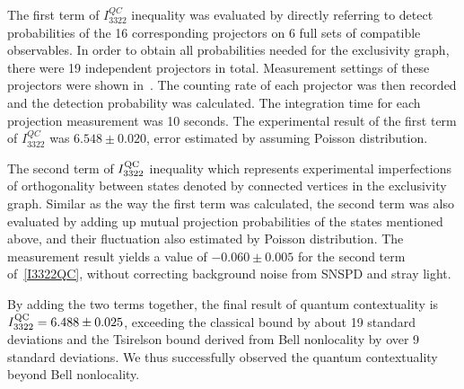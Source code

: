 \documentclass[prl,letterpaper,english,reprint,nofootinbib,aps,superscriptaddress,showpacs,showkeys]{revtex4-1}
\theoremstyle{definition}
\theoremstyle{remark}
\begin{document}
 The first term of $I_{3322}^{QC}$ inequality was evaluated by directly referring to detect probabilities of the 16 corresponding projectors on $6$ full sets of compatible observables. In order to obtain all probabilities needed for the exclusivity graph, there were 19 independent projectors in total.
 Measurement settings of these projectors were shown in~\cite{SM}.
 The counting rate of each projector was then recorded and the detection probability was calculated. The integration time for each projection measurement was 10 seconds. 
 The experimental result of the first term of $I_{3322}^{QC}$ was $6.548 \pm 0.020$, error estimated by assuming Poisson distribution.

 The second term of $I_{3322}^{\rm QC}$ inequality which represents experimental imperfections of orthogonality between states denoted by connected vertices in the exclusivity graph.
 Similar as the way the first term was calculated, the second term was also evaluated by adding up mutual projection probabilities of the states mentioned above, and their fluctuation also estimated by Poisson distribution. The measurement result yields a value of $-0.060 \pm 0.005$ for the second term of~\ref{I3322QC}, without correcting background noise from SNSPD and stray light.

 By adding the two terms together, the final result of quantum contextuality is $I_{3322}^{\rm QC}=6.488 \pm 0.025$, exceeding the classical bound by about 19 standard deviations and the Tsirelson bound derived from Bell nonlocality by over 9 standard deviations. We thus successfully observed the quantum contextuality beyond Bell nonlocality.
\end{document}
